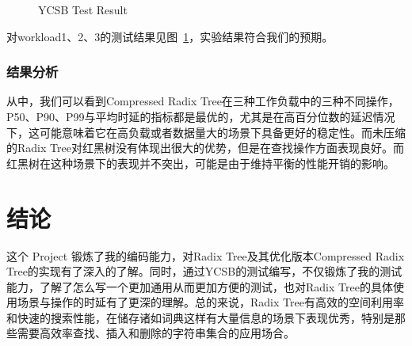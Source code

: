 \documentclass[fontset=windows]{article}
\begin{document}
\begin{figure} [h!]
\centering
{}
\caption{YCSB Test Result}
\label{fig:ycsbResult}
\end{figure}
对workload1、2、3的测试结果见图~\ref{fig:ycsbResult}，实验结果符合我们的预期。

\subsubsection{结果分析}
从中，我们可以看到Compressed Radix Tree在三种工作负载中的三种不同操作，P50、P90、P99与平均时延的指标都是最优的，尤其是在高百分位数的延迟情况下，这可能意味着它在高负载或者数据量大的场景下具备更好的稳定性。而未压缩的Radix Tree对红黑树没有体现出很大的优势，但是在查找操作方面表现良好。而红黑树在这种场景下的表现并不突出，可能是由于维持平衡的性能开销的影响。

\section{结论}
这个 Project 锻炼了我的编码能力，对Radix Tree及其优化版本Compressed Radix Tree的实现有了深入的了解。同时，通过YCSB的测试编写，不仅锻炼了我的测试能力，了解了怎么写一个更加通用从而更加方便的测试，也对Radix Tree的具体使用场景与操作的时延有了更深的理解。总的来说，Radix Tree有高效的空间利用率和快速的搜索性能，在储存诸如词典这样有大量信息的场景下表现优秀，特别是那些需要高效率查找、插入和删除的字符串集合的应用场合。
\end{document}
